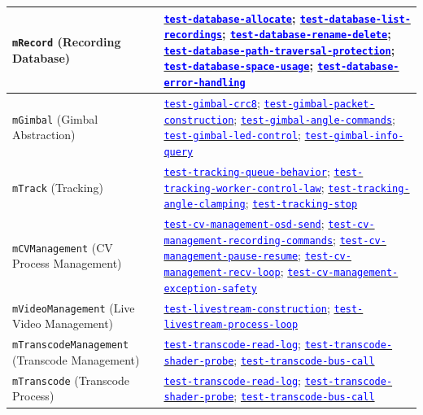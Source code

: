 \documentclass[12pt, titlepage]{article}
\newcommand{\mref}[1]{\texttt{#1}}
\newcommand{\tid}[1]{\hyperlink{tid:#1}{\textcolor{blue}{\texttt{#1}}}}
\begin{document}
\begin{longtable}{|p{4.5cm}|p{10cm}|}
  \hline
  \mref{mRecord} (Recording Database)                & \tid{test-database-allocate}; \tid{test-database-list-recordings}; \tid{test-database-rename-delete}; \tid{test-database-path-traversal-protection}; \tid{test-database-space-usage}; \tid{test-database-error-handling}                                                                  \\
  \hline
  \mref{mGimbal} (Gimbal Abstraction)                & \tid{test-gimbal-crc8}; \tid{test-gimbal-packet-construction}; \tid{test-gimbal-angle-commands}; \tid{test-gimbal-led-control}; \tid{test-gimbal-info-query}                                                                                                                              \\
  \hline
  \mref{mTrack} (Tracking)                           & \tid{test-tracking-queue-behavior}; \tid{test-tracking-worker-control-law}; \tid{test-tracking-angle-clamping}; \tid{test-tracking-stop}                                                                                                                                                  \\
  \hline
  \mref{mCVManagement} (CV Process Management)       & \tid{test-cv-management-osd-send}; \tid{test-cv-management-recording-commands}; \tid{test-cv-management-pause-resume}; \tid{test-cv-management-recv-loop}; \tid{test-cv-management-exception-safety}                                                                                      \\
  \hline
  \mref{mVideoManagement} (Live Video Management)    & \tid{test-livestream-construction}; \tid{test-livestream-process-loop}                                                                                                                                                                                                                    \\
  \hline
  \mref{mTranscodeManagement} (Transcode Management) & \tid{test-transcode-read-log}; \tid{test-transcode-shader-probe}; \tid{test-transcode-bus-call}                                                                                                                                                                                           \\
  \hline
  \mref{mTranscode} (Transcode Process)              & \tid{test-transcode-read-log}; \tid{test-transcode-shader-probe}; \tid{test-transcode-bus-call}                                                                                                                                                                                           \\

\end{longtable}
\end{document}
